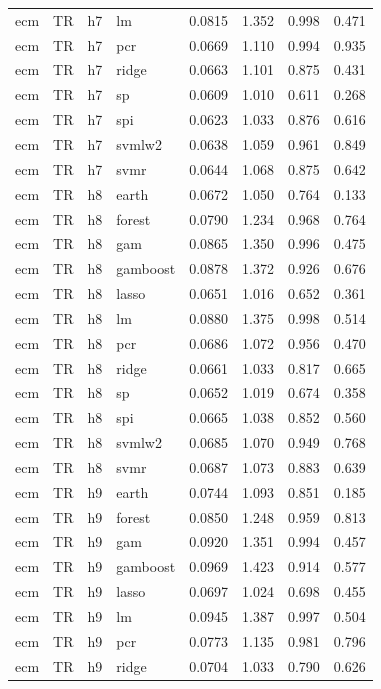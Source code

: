 \begin{ThreePartTable}
\begin{longtable}[t]{llclcccc}
ecm & TR & h7 & lm & 0.0815 & 1.352 & 0.998 & 0.471\\
ecm & TR & h7 & pcr & 0.0669 & 1.110 & 0.994 & 0.935\\
ecm & TR & h7 & ridge & 0.0663 & 1.101 & 0.875 & 0.431\\
ecm & TR & h7 & sp & 0.0609 & 1.010 & 0.611 & 0.268\\
ecm & TR & h7 & spi & 0.0623 & 1.033 & 0.876 & 0.616\\
ecm & TR & h7 & svmlw2 & 0.0638 & 1.059 & 0.961 & 0.849\\
ecm & TR & h7 & svmr & 0.0644 & 1.068 & 0.875 & 0.642\\
\addlinespace
ecm & TR & h8 & earth & 0.0672 & 1.050 & 0.764 & 0.133\\
ecm & TR & h8 & forest & 0.0790 & 1.234 & 0.968 & 0.764\\
ecm & TR & h8 & gam & 0.0865 & 1.350 & 0.996 & 0.475\\
ecm & TR & h8 & gamboost & 0.0878 & 1.372 & 0.926 & 0.676\\
ecm & TR & h8 & lasso & 0.0651 & 1.016 & 0.652 & 0.361\\
ecm & TR & h8 & lm & 0.0880 & 1.375 & 0.998 & 0.514\\
ecm & TR & h8 & pcr & 0.0686 & 1.072 & 0.956 & 0.470\\
ecm & TR & h8 & ridge & 0.0661 & 1.033 & 0.817 & 0.665\\
ecm & TR & h8 & sp & 0.0652 & 1.019 & 0.674 & 0.358\\
ecm & TR & h8 & spi & 0.0665 & 1.038 & 0.852 & 0.560\\
ecm & TR & h8 & svmlw2 & 0.0685 & 1.070 & 0.949 & 0.768\\
ecm & TR & h8 & svmr & 0.0687 & 1.073 & 0.883 & 0.639\\
\addlinespace
ecm & TR & h9 & earth & 0.0744 & 1.093 & 0.851 & 0.185\\
ecm & TR & h9 & forest & 0.0850 & 1.248 & 0.959 & 0.813\\
ecm & TR & h9 & gam & 0.0920 & 1.351 & 0.994 & 0.457\\
ecm & TR & h9 & gamboost & 0.0969 & 1.423 & 0.914 & 0.577\\
ecm & TR & h9 & lasso & 0.0697 & 1.024 & 0.698 & 0.455\\
ecm & TR & h9 & lm & 0.0945 & 1.387 & 0.997 & 0.504\\
ecm & TR & h9 & pcr & 0.0773 & 1.135 & 0.981 & 0.796\\
ecm & TR & h9 & ridge & 0.0704 & 1.033 & 0.790 & 0.626\\

\end{longtable}
\end{ThreePartTable}
